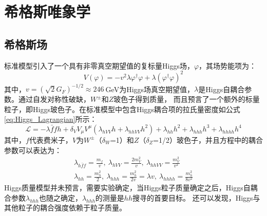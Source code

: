 \chapter{希格斯唯象学}\label{chap:pheno}
\section{希格斯场}
标准模型引入了一个具有非零真空期望值的复标量Higgs场，$\varphi$，其场势能项为：
\begin{equation}
 V(\varphi)=-v^2\lambda\varphi^{\dagger}\varphi+\lambda(\varphi^{\dagger}\varphi)^2
\end{equation}
其中，$v=(\sqrt{2}G_{F})^{-1/2}\approx246~$GeV为Higgs场真空期望值，$\lambda$是Higgs自耦合参数。通过自发对称性破缺，$W^{\pm}$和$Z$玻色子得到质量，
而且预言了一个额外的标量粒子，即Higgs玻色子。在标准模型中包含Higgs耦合项的拉氏量密度如公式\ref{eq:Higgs_Lagrangian}所示：
\begin{equation}
\label{eq:Higgs_Lagrangian}
\mathcal{L}=-\lambda\bar{f}fh+\delta_{V}V_{\mu}V^{\mu}(\lambda_{hVV}h+\lambda_{hhVV}h^2)+\lambda_{hh}h^2+\lambda_{hhh}h^3+\lambda_{hhhh}h^4
\end{equation}
其中，$f$代表费米子，$V$为$W^{\pm}$（$\delta_{W}$=1）和$Z$（$\delta_{Z}$=1/2）玻色子，并且方程中的耦合参数可以表达为：
\begin{equation}
 \begin{aligned}
 \lambda_{h\bar{f}f}=\frac{m_{f}}{v},~\lambda_{hVV}=\frac{2m_{V}^{2}}{v},~\lambda_{hhVV}=\frac{m_{V}^2}{v^2} \\
 \lambda_{hh}=\frac{m_{h}^2}{2},~\lambda_{hhh}=\frac{m_{h}^2}{2v}=\lambda v,~\lambda_{hhhh}=\frac{m_{h}^2}{8v^2}
 \end{aligned}
\end{equation}
Higgs质量模型并未预言，需要实验确定，当Higgs粒子质量确定之后，Higgs自耦合参数$\lambda_{hhh}$也随之确定，$\lambda_{hhh}$的测量是$hh$搜寻的首要目标。
还可以发现，Higgs与其他粒子的耦合强度依赖于粒子质量。

